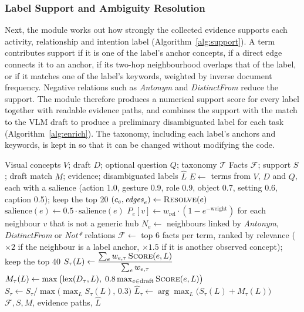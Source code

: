 \subsubsection{Label Support and Ambiguity Resolution}
Next, the module works out how strongly the collected evidence supports each activity, relationship and intention label (Algorithm~\ref{alg:support}). A term contributes support if it is one of the label's anchor concepts, if a direct edge connects it to an anchor, if its two-hop neighbourhood overlaps that of the label, or if it matches one of the label's keywords, weighted by inverse document frequency. Negative relations such as \emph{Antonym} and \emph{DistinctFrom} reduce the support. The module therefore produces a numerical support score for every label together with readable evidence paths, and combines the support with the match to the VLM draft to produce a preliminary disambiguated label for each task (Algorithm~\ref{alg:enrich}). The taxonomy, including each label's anchors and keywords, is kept in  so that it can be changed without modifying the code.

\begin{algorithm}[H]
\caption{ConceptNet Commonsense Enrichment}
\label{alg:enrich}
\begin{algorithmic}[1]
\Require Visual concepts $V$; draft $D$; optional question $Q$; taxonomy $\mathcal{T}$
\Ensure Facts $\mathcal{F}$; support $S$; draft match $M$; evidence; disambiguated labels $\hat{L}$
\State $E \gets$ terms from $V$, $D$ and $Q$, each with a salience (action 1.0, gesture 0.9, role 0.9, object 0.7, setting 0.6, caption 0.5); keep the top 20
  \State $(c_e, \mathit{edges}_e) \gets \textsc{Resolve}(e)$ 
    \State $\mathrm{salience}(e) \gets 0.5 \cdot \mathrm{salience}(e)$ 
  \EndIf
  \State $P_e[v] \gets w_{\text{rel}} \cdot (1 - e^{-\text{weight}})$ for each neighbour $v$ that is not a generic hub
  \State $N_e \gets$ neighbours linked by \emph{Antonym}, \emph{DistinctFrom} or \emph{Not*} relations
\EndFor
\State $\mathcal{F} \gets$ top 6 facts per term, ranked by relevance ($\times 2$ if the neighbour is a label anchor, $\times 1.5$ if it is another observed concept); keep the top 40
    \State $S_\tau(L) \gets \dfrac{\sum_e w_{e,\tau}\, \textsc{Score}(e, L)}{\sum_e w_{e,\tau}}$ 
    \State $M_\tau(L) \gets \max\big(\mathrm{lex}(D_\tau, L),\; 0.8 \max_{e \in \text{draft}} \textsc{Score}(e, L)\big)$
  \EndFor
  \State $S_\tau \gets S_\tau / \max\big(\max_L S_\tau(L),\, 0.3\big)$
  \State $\hat{L}_\tau \gets \arg\max_L \big(S_\tau(L) + M_\tau(L)\big)$
\EndFor
\State \Return $\mathcal{F}, S, M$, evidence paths, $\hat{L}$
\end{algorithmic}
\end{algorithm}

